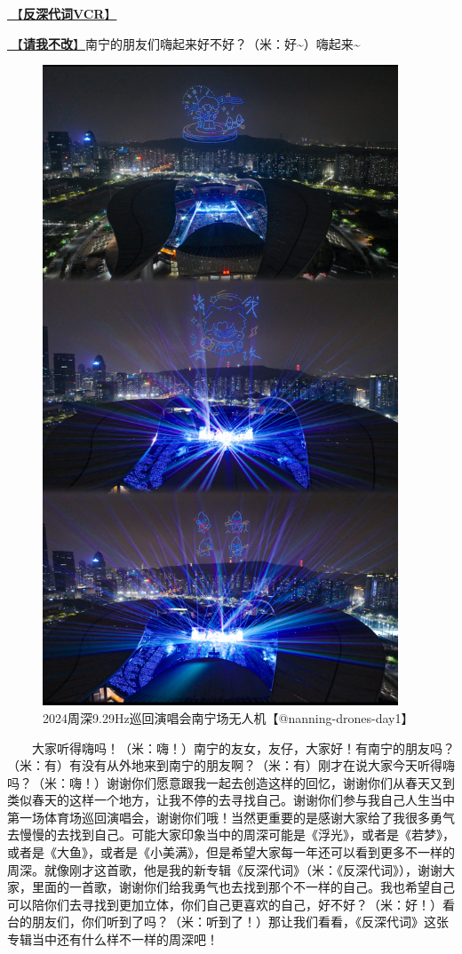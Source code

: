 \documentclass[]{ctexbook}
\begin{document}
\hyperref[senself-vcr]{🎥【\textbf{反深代词VCR}】}

\hyperref[brave-heart]{🎵【\textbf{请我不改}】}南宁的朋友们嗨起来好不好？（米：好\textasciitilde）嗨起来\textasciitilde{}

\begin{figure}

{\centering \includegraphics[width=300pt]{img/nanning20241206/001} 

}

\caption{2024周深9.29Hz巡回演唱会南宁场无人机【@nanning-drones-day1】}\label{fig:unnamed-chunk-151}
\end{figure}

  大家听得嗨吗！（米：嗨！）南宁的友女，友仔，大家好！有南宁的朋友吗？（米：有）有没有从外地来到南宁的朋友啊？（米：有）刚才在说大家今天听得嗨吗？（米：嗨！）谢谢你们愿意跟我一起去创造这样的回忆，谢谢你们从春天又到类似春天的这样一个地方，让我不停的去寻找自己。谢谢你们参与我自己人生当中第一场体育场巡回演唱会，谢谢你们哦！当然更重要的是感谢大家给了我很多勇气去慢慢的去找到自己。可能大家印象当中的周深可能是《浮光》，或者是《若梦》，或者是《大鱼》，或者是《小美满》，但是希望大家每一年还可以看到更多不一样的周深。就像刚才这首歌，他是我的新专辑《反深代词》（米：《反深代词》），谢谢大家，里面的一首歌，谢谢你们给我勇气也去找到那个不一样的自己。我也希望自己可以陪你们去寻找到更加立体，你们自己更喜欢的自己，好不好？（米：好！）看台的朋友们，你们听到了吗？（米：听到了！）那让我们看看，《反深代词》这张专辑当中还有什么样不一样的周深吧！
\end{document}
